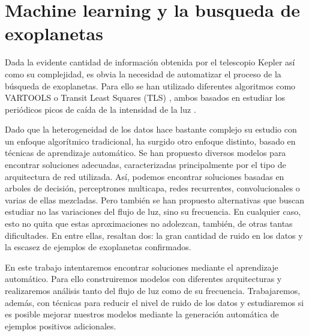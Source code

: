 \section{Machine learning y la busqueda de exoplanetas}

Dada la evidente cantidad de información obtenida por el telescopio Kepler así como su complejidad, es obvia la necesidad de automatizar el proceso de la búsqueda de exoplanetas. Para ello se han utilizado diferentes algoritmos como VARTOOLS \cite{2016A&C....17....1H} o Transit Least Squares (TLS) \cite{2019A&A...623A..39H}, ambos basados en estudiar los periódicos picos de caída de la intensidad de la luz \cite{Minsky-1969}.

Dado que la heterogeneidad de los datos hace bastante complejo su estudio con un enfoque algorítmico tradicional, ha surgido otro enfoque distinto, basado en técnicas de aprendizaje automático. Se han propuesto diversos modelos para encontrar soluciones adecuadas, caracterizadas principalmente por el tipo de arquitectura de red utilizada. Así, podemos encontrar soluciones basadas en arboles de decisión, perceptrones multicapa, redes recurrentes, convolucionales o varias de ellas mezcladas. Pero también se han propuesto alternativas que buscan estudiar no las variaciones del flujo de luz, sino su frecuencia. En cualquier caso, esto no quita que estas aproximaciones no adolezcan, también, de otras tantas dificultades. En entre ellas, resaltan dos: la gran cantidad de ruido en los datos y la escasez de ejemplos de exoplanetas confirmados.

En este trabajo intentaremos encontrar soluciones mediante el aprendizaje automático. Para ello construiremos modelos con diferentes arquitecturas y realizaremos análisis tanto del flujo de luz como de su frecuencia. Trabajaremos, además, con técnicas para reducir el nivel de ruido de los datos y estudiaremos si es posible mejorar nuestros modelos mediante la generación automática de ejemplos positivos adicionales. 